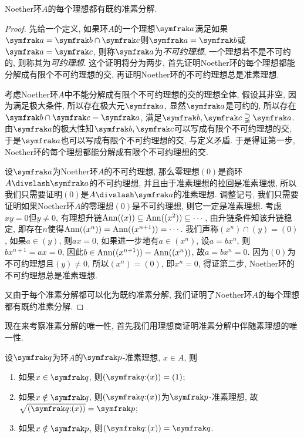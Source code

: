 \begin{theorem}\label{thm:laskernoether}
  Noether环$A$的每个理想都有既约准素分解.
\end{theorem}

\begin{proof}
  先给一个定义, 如果环$A$的一个理想$\ideal{a}$满足如果$\ideal{a}=\ideal{b}\cap\ideal{c}$则$\ideal{a}=\ideal{b}$或$\ideal{a}=\ideal{c}$, 则称$\ideal{a}$为\emph{不可约理想}, 一个理想若不是不可约的, 则称其为\emph{可约理想}. 这个证明将分为两步, 首先证明Noether环的每个理想都能分解成有限个不可约理想的交, 再证明Noether环的不可约理想总是准素理想.

  考虑Noether环$A$中不能分解成有限个不可约理想的交的理想全体, 假设其非空, 因为满足极大条件, 所以存在极大元$\ideal{a}$, 显然$\ideal{a}$是可约的, 所以存在$\ideal{b}\cap\ideal{c}=\ideal{a}$, 满足$\ideal{b}, \ideal{c}\supsetneqq\ideal{a}$. 由$\ideal{a}$的极大性知$\ideal{b}, \ideal{c}$可以写成有限个不可约理想的交, 于是$\ideal{a}$也可以写成有限个不可约理想的交, 与定义矛盾. 于是得证第一步, Noether环的每个理想都能分解成有限个不可约理想的交.

  设$\ideal{a}$为Noether环$A$的不可约理想, 那么零理想$(0)$是商环$A{\divslash}\ideal{a}$的不可约理想, 并且由于准素理想的拉回是准素理想, 所以我们只需要证明$(0)$是$A{\divslash}\ideal{a}$的准素理想. 调整记号, 我们只需要证明如果Noether环$A$的零理想$(0)$是不可约理想, 则它一定是准素理想. 考虑$xy=0$但$y\neq 0$, 有理想升链$\operatorname{Ann}((x))\subseteq\operatorname{Ann}((x^2))\subseteq\dotsb$, 由升链条件知该升链稳定, 即存在$n$使得$\operatorname{Ann}((x^n))=\operatorname{Ann}((x^{n+1}))=\dotsb$. 我们声称$(x^n)\cap (y)=(0)$, 如果$a\in (y)$, 则$ax=0$, 如果进一步地有$a\in (x^n)$, 设$a=bx^n$, 则$bx^{n+1}=ax=0$, 因此$b\in\operatorname{Ann}((x^{n+1}))=\operatorname{Ann}((x^n))$, 故$a=bx^n=0$. 因为$(0)$为不可约理想且$(y)\neq 0$, 所以$(x^n)=(0)$, 即$x^n=0$, 得证第二步, Noether环的不可约理想总是准素理想.

  又由于每个准素分解都可以化为既约准素分解, 我们证明了Noether环$A$的每个理想都有既约准素分解.
\end{proof}

现在来考察准素分解的唯一性, 首先我们用理想商证明准素分解中伴随素理想的唯一性.

\begin{propositionnoproof}\label{prop:idealquotprimary}
  设$\ideal{q}$为环$A$的$\ideal{p}$-准素理想, $x\in A$, 则
  \begin{enumerate}
    \item 如果$x\in \ideal{q}$, 则$(\ideal{q}{:}(x))=(1)$;
    \item 如果$x\notin\ideal{q}$, 则$(\ideal{q}{:}(x))$为$\ideal{p}$-准素理想, 故$\sqrt{(\ideal{q}{:}(x))}=\ideal{p}$;
    \item 如果$x\notin\ideal{p}$, 则$(\ideal{q}{:}(x))=\ideal{q}$.
  \end{enumerate}
\end{propositionnoproof}

